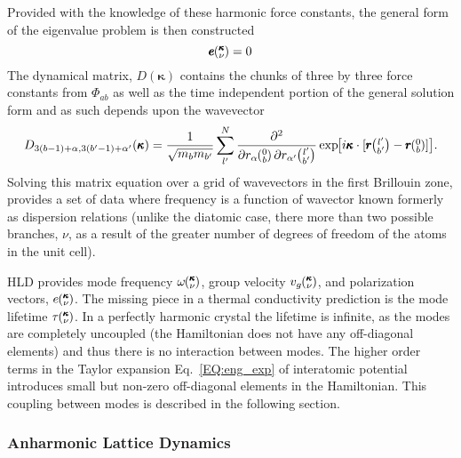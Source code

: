 Provided with the knowledge of these harmonic force constants, the general form of the eigenvalue problem is then constructed \cite{dove_introduction_1993-3}
\begin{equation}
[D(\pmb{\kappa})-I\omega^2\kv]\pmb{e}\kv = 0
\end{equation}
%
The dynamical matrix, $D(\pmb{\kappa})$ contains the chunks of three by three force constants from $\Phi_{ab}$ as well as the time independent portion of the general solution form and as such depends upon the wavevector
\begin{equation}
D_{3(b-1)+\alpha,3(b'-1)+\alpha'}(\pmb{\kappa})=\frac{1}{\sqrt{m_bm_{b'}}}\sum_{l'}^N\frac{\partial^2}{\partial r_\alpha \Ob \partial r_{\alpha'} \lbp} \EXP{i\pmb{\kappa}\cdot [\pmb{r}\lbp-\pmb{r}\Ob]}.
\end{equation}
Solving this matrix equation over a grid of wavevectors in the first Brillouin zone, provides a set of data where frequency is a function of wavector known formerly as dispersion relations (unlike the diatomic case, there more than two possible branches, $\nu$, as a result of the greater number of degrees of freedom of the atoms in the unit cell). 

HLD provides mode frequency $\omega \mspace{-4.0mu}\left(\mspace{-8.0mu} \begin{smallmatrix}&\pmb{\kappa} \\&\nu\end{smallmatrix} \mspace{-3.0mu}\right)$, group velocity $v_g\mspace{-4.0mu}\left(\mspace{-8.0mu} \begin{smallmatrix}&\pmb{\kappa} \\&\nu\end{smallmatrix} \mspace{-3.0mu}\right)$, and polarization vectors, $e\mspace{-4.0mu}\left(\mspace{-8.0mu} \begin{smallmatrix}&\pmb{\kappa} \\&\nu\end{smallmatrix} \mspace{-3.0mu}\right)$. The missing piece in a thermal conductivity prediction is the mode lifetime $\tau \mspace{-4.0mu}\left(\mspace{-8.0mu} \begin{smallmatrix}&\pmb{\kappa} \\&\nu\end{smallmatrix} \mspace{-3.0mu}\right)$. In a perfectly harmonic crystal the lifetime is infinite, as the modes are completely uncoupled (the Hamiltonian does not have any off-diagonal elements) and thus there is no interaction between modes. The higher order terms in the Taylor expansion Eq.~\ref{EQ:eng_exp} of interatomic potential introduces small but non-zero off-diagonal elements in the Hamiltonian. This coupling between modes is described in the following section.

\subsubsection{Anharmonic Lattice Dynamics}


